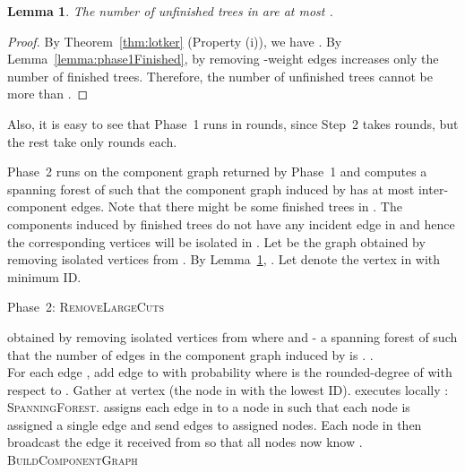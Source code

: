 \documentclass[11pt]{article}
\newtheorem{lemma}[theorem]{Lemma}
\begin{document}
\begin{lemma}
  \label{lemma:phase1Unfinished}
  The number of unfinished trees in  are at most . 
\end{lemma}
\begin{proof}
  By Theorem~\ref{thm:lotker} (Property (i)), we have . 
  By Lemma~\ref{lemma:phase1Finished}, by removing -weight edges increases only the number of finished trees. 
  Therefore, the number of unfinished trees cannot be more than . 
\end{proof}
\noindent Also, it is easy to see that Phase~1 runs in  rounds, since Step~2 takes  rounds, but the rest take only  rounds each.   
\begin{comment}
\begin{lemma}
  \textsc{BuildComponentGraph} runs in  rounds in the Congested Clique.
\end{lemma}
\begin{proof}
  Please refer to the description of \textsc{BuildComponentGraph}. 
  By Lemma~\ref{lemma:f}, there are at most  different components and hence a node  has at most  neighbors  with distinct  values. 
  Hence the sending queue of each node has at most  messages to send. 
  Every leader has to receive at most  messages since each node sends at most one message to each leader. 
  Therefore by using Lenzen's routing algorithm we can route these messages in  rounds on the Congested Clique. 
\end{proof}
\end{comment}
 
Phase~2 runs on the component graph  returned by Phase~1 and computes a spanning forest  of  such that the component graph induced by  has at most  inter-component edges. 
Note that there might be some finished trees in . 
The components induced by finished trees do not have any incident edge in  and hence the corresponding vertices will be isolated in . 
Let  be the graph obtained by removing isolated vertices from . 
By Lemma~\ref{lemma:phase1Unfinished}, . 
Let  denote the vertex in  with minimum ID.
\begin{algorithm}[H]
  \caption{Phase~2: \textsc{RemoveLargeCuts} \label{algo:phase2}}
  \begin{algorithmic}[1]
    \REQUIRE  obtained by removing isolated vertices from  where  and   
    \ENSURE   - a spanning forest of  such that the number of edges in the component graph  induced by  is .
    \STATE  . \\ For each edge , add edge  to  with probability  where  is the rounded-degree of  with respect to .
    \STATE  Gather  at vertex  (the node in  with the lowest ID).
    \STATE   executes locally : \textsc{SpanningForest}. 
    \STATE   assigns each edge in  to a node in  such that each node is assigned a single edge and send edges to assigned nodes.  
    Each node in  then broadcast the edge it received from  so that all nodes now know .   
    \STATE   \textsc{BuildComponentGraph} 
    \RETURN 
  \end{algorithmic}
\end{algorithm}
\end{document}
